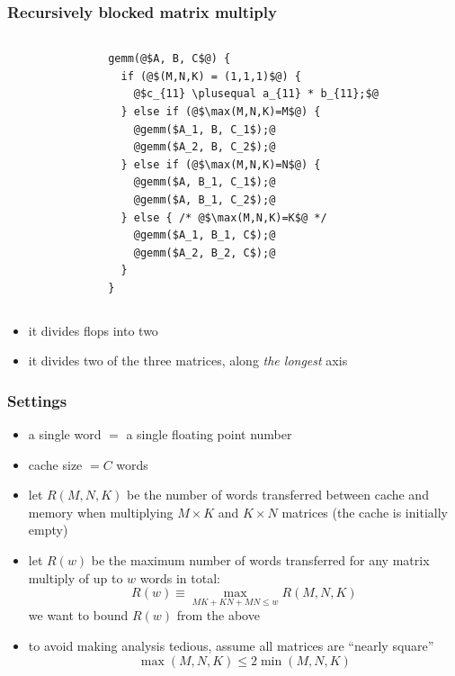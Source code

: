 \documentclass[12pt,dvipdfmx]{beamer}
\newcommand{\plusequal}{\mbox{\tt\ += }}
\newcommand{\ao}[1]{{\color{blue}#1}}
\begin{document}
\begin{frame}[fragile]
\frametitle{Recursively blocked matrix multiply}
\begin{columns}[t]
\begin{column}{0.47\textwidth}

\begin{center}
\def\svgwidth{0.8\textwidth}
{\tiny}
\end{center}

\end{column}
\begin{column}{0.43\textwidth}
\begin{lstlisting}[basicstyle=\scriptsize]
gemm(@$A, B, C$@) {
  if (@$(M,N,K) = (1,1,1)$@) {
    @$c_{11} \plusequal a_{11} * b_{11};$@
  } else if (@$\max(M,N,K)=M$@) {
    @gemm($A_1, B, C_1$);@
    @gemm($A_2, B, C_2$);@
  } else if (@$\max(M,N,K)=N$@) {
    @gemm($A, B_1, C_1$);@
    @gemm($A, B_1, C_2$);@
  } else { /* @$\max(M,N,K)=K$@ */
    @gemm($A_1, B_1, C$);@
    @gemm($A_2, B_2, C$);@
  }
}
\end{lstlisting}
\end{column}
\end{columns}

\begin{itemize}
\item it divides flops into two 
\item it divides two of the three matrices, 
along \ao{\em the longest} axis
\end{itemize}

\end{frame}

\begin{frame}
\frametitle{Settings}
\begin{itemize}
\item<1-> a single \ao{word} $=$ a single floating point number
\item<1-> cache size \ao{$= C$ words}
\item<2-> let \ao{$R(M, N, K)$} be
  the number of words transferred between cache and memory when
  multiplying $M\times K$ and $K\times N$ matrices
  (the cache is initially empty)
\item<3-> let \ao{$R(w)$} be the maximum number of words transferred for 
  any matrix multiply of up to $w$ words in total:
\[ R(w) \equiv \max_{MK+KN+MN\leq w} R(M,N,K) \]
we want to bound $R(w)$ from the above
\item<4-> to avoid making analysis tedious, assume all matrices are
  \ao{``nearly square''}
\[ \max(M,N,K) \leq 2 \min(M,N,K) \]
\end{itemize}
\end{frame}
\end{document}
